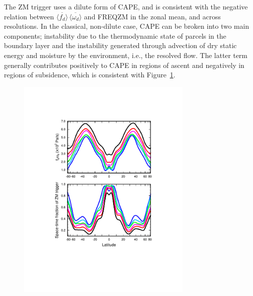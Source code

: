 The ZM trigger uses a dilute form of CAPE, and is consistent with the negative relation between $\overline{\langle f_{d} \rangle} \, \overline{\langle \omega_{d} \rangle}$ and FREQZM in the zonal mean, and across resolutions. In the classical, non-dilute case, CAPE can be broken into two main components; instability due to the thermodynamic state of parcels in the boundary layer and the instability generated through advection of dry static energy and moisture by the environment, i.e., the resolved flow. The latter term generally contributes positively to CAPE in regions of ascent and negatively in regions of subsidence, which is consistent with Figure~\ref{fig:vomg}.

\begin{figure}[t]
\begin{center}
\noindent\includegraphics[width=20pc,angle=0]{chapter6/temp_zonal_fracd*vomgd.pdf}\\
\end{center}
\caption{}
\label{fig:vomg}
\end{figure}

